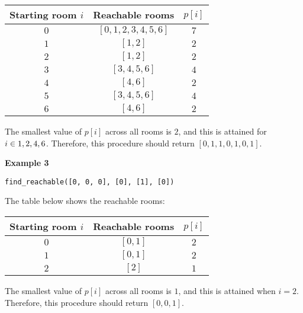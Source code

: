 \begin{center}
\renewcommand{\arraystretch}{1.5}
\begin{tabular}{|c|c|c|}
\hline
Starting room $i$ & Reachable rooms & $p[i]$ \\
\hline
$0$ & $[0,1,2,3,4,5,6]$ & $7$\\
\hline
$1$ & $[1,2]$ & $2$\\
\hline
$2$ & $[1,2]$ & $2$\\
\hline
$3$ & $[3,4,5,6]$ & $4$\\
\hline
$4$ & $[4,6]$ & $2$\\
\hline
$5$ & $[3,4,5,6]$ & $4$\\
\hline
$6$ & $[4,6]$ & $2$\\
\hline
\end{tabular}
\end{center}

The smallest value of $p[i]$ across all rooms is $2$, and this is attained for $i \in \\{1,2,4,6\\}$. Therefore,
this procedure should return $[0,1,1,0,1,0,1]$.

\textbf{Example 3}

\texttt{find\_reachable([0, 0, 0], [0], [1], [0])}

The table below shows the reachable rooms:

\begin{center}
\renewcommand{\arraystretch}{1.5}
\begin{tabular}{|c|c|c|}
\hline
Starting room $i$ & Reachable rooms & $p[i]$ \\
\hline
$0$ & $[0,1]$ & $2$\\
\hline
$1$ & $[0,1]$ & $2$\\
\hline
$2$ & $[2]$ & $1$\\
\hline
\end{tabular}
\end{center}

The smallest value of $p[i]$ across all rooms is $1$, and this is attained when $i=2$. Therefore, this procedure should return $[0,0,1]$.



